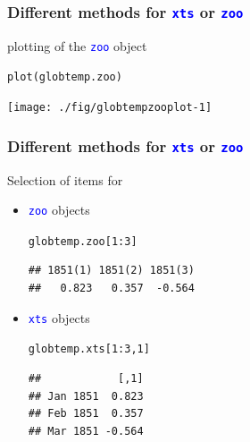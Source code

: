 \documentclass[xcolor=table, xcolor=dvipsnames]{beamer}\usepackage[]{graphicx}\usepackage[]{color}
\makeatletter
\newcommand{\hlnum}[1]{\textcolor[rgb]{0,0,0}{#1}}
\newcommand{\hlopt}[1]{\textcolor[rgb]{0,0,0}{#1}}
\newcommand{\hlstd}[1]{\textcolor[rgb]{0,0,0}{#1}}
\newcommand{\hlkwd}[1]{\textcolor[rgb]{0,0,1}{#1}}
\newenvironment{kframe}{%
 \def\at@end@of@kframe{}%
 \ifinner\ifhmode%
  \def\at@end@of@kframe{\end{minipage}}%
  \begin{minipage}{\columnwidth}%
 \fi\fi%
 \def\FrameCommand##1{\hskip\@totalleftmargin \hskip-\fboxsep
 \colorbox{shadecolor}{##1}\hskip-\fboxsep
     \hskip-\linewidth \hskip-\@totalleftmargin \hskip\columnwidth}%
 \MakeFramed {\advance\hsize-\width
   \@totalleftmargin\z@ \linewidth\hsize
   \@setminipage}}%
 {\par\unskip\endMakeFramed%
 \at@end@of@kframe}
\newenvironment{knitrout}{}{} %
\newcommand{\rcode}[1]{\texttt{\textcolor{Blue}{#1}}} %
\makeatother
\begin{document}
\begin{frame}[fragile]\frametitle{Different methods for \rcode{xts} or \rcode{zoo}}
plotting of the \rcode{zoo} object %
\begin{knitrout}
\color{fgcolor}\begin{kframe}
\begin{alltt}
\hlkwd{plot}\hlstd{(globtemp.zoo)}
\end{alltt}
\end{kframe}

{\centering \texttt{[image: ./fig/globtempzooplot-1]} 

}



\end{knitrout}
\end{frame}


\begin{frame}[fragile]\frametitle{Different methods for \rcode{xts} or \rcode{zoo}}
Selection of items for
\begin{itemize}
\item \rcode{zoo} objects
\begin{knitrout}
\color{fgcolor}\begin{kframe}
\begin{alltt}
\hlstd{globtemp.zoo[}\hlnum{1}\hlopt{:}\hlnum{3}\hlstd{]}
\end{alltt}
\begin{verbatim}
## 1851(1) 1851(2) 1851(3) 
##   0.823   0.357  -0.564
\end{verbatim}
\end{kframe}
\end{knitrout}
\item \rcode{xts} objects
\begin{knitrout}
\color{fgcolor}\begin{kframe}
\begin{alltt}
\hlstd{globtemp.xts[}\hlnum{1}\hlopt{:}\hlnum{3}\hlstd{,}\hlnum{1}\hlstd{]}
\end{alltt}
\begin{verbatim}
##            [,1]
## Jan 1851  0.823
## Feb 1851  0.357
## Mar 1851 -0.564
\end{verbatim}
\end{kframe}
\end{knitrout}
\end{itemize}
\end{frame}
\end{document}
